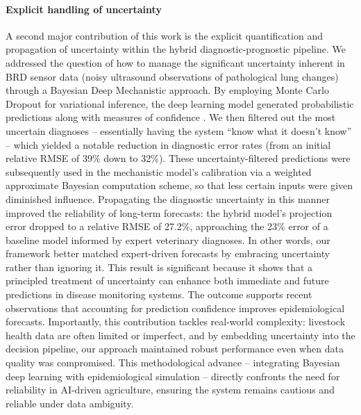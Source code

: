 \paragraph{Explicit handling of uncertainty}  A second major contribution of this work is the explicit quantification and propagation of uncertainty within the hybrid diagnostic-prognostic pipeline. We addressed the question of how to manage the significant uncertainty inherent in BRD sensor data (noisy ultrasound observations of pathological lung changes) through a Bayesian Deep Mechanistic approach. By employing Monte Carlo Dropout for variational inference, the deep learning model generated probabilistic predictions along with measures of confidence \cite{gal_dropout_2016}. We then filtered out the most uncertain diagnoses – essentially having the system “know what it doesn’t know” – which yielded a notable reduction in diagnostic error rates (from an initial relative RMSE of 39\% down to 32\%). These uncertainty-filtered predictions were subsequently used in the mechanistic model’s calibration via a weighted approximate Bayesian computation scheme, so that less certain inputs were given diminished influence. Propagating the diagnostic uncertainty in this manner improved the reliability of long-term forecasts: the hybrid model’s projection error dropped to a relative RMSE of 27.2\%, approaching the 23\% error of a baseline model informed by expert veterinary diagnoses. In other words, our framework better matched expert-driven forecasts by embracing uncertainty rather than ignoring it. This result is significant because it shows that a principled treatment of uncertainty can enhance both immediate and future predictions in disease monitoring systems. The outcome supports recent observations that accounting for prediction confidence improves epidemiological forecasts. Importantly, this contribution tackles real-world complexity: livestock health data are often limited or imperfect, and by embedding uncertainty into the decision pipeline, our approach maintained robust performance even when data quality was compromised. This methodological advance – integrating Bayesian deep learning with epidemiological simulation – directly confronts the need for reliability in AI-driven agriculture, ensuring the system remains cautious and reliable under data ambiguity.


